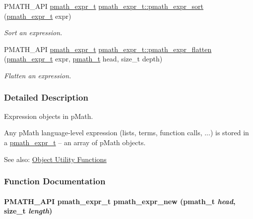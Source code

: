 \begin{CompactItemize}
PMATH\_\-API \hyperlink{classpmath__expr__t}{pmath\_\-expr\_\-t} \hyperlink{group__expressions_gb3708a99c95943b062a91797d340dd7b}{pmath\_\-expr\_\-t::pmath\_\-expr\_\-sort} (\hyperlink{classpmath__expr__t}{pmath\_\-expr\_\-t} expr)
\begin{CompactList}\small\item\em Sort an expression. \item\end{CompactList}\item 
PMATH\_\-API \hyperlink{classpmath__expr__t}{pmath\_\-expr\_\-t} \hyperlink{group__expressions_g9162f7fe8a42627c5adf6185dba9e67d}{pmath\_\-expr\_\-t::pmath\_\-expr\_\-flatten} (\hyperlink{classpmath__expr__t}{pmath\_\-expr\_\-t} expr, \hyperlink{classpmath__t}{pmath\_\-t} head, size\_\-t depth)
\begin{CompactList}\small\item\em Flatten an expression. \item\end{CompactList}\end{CompactItemize}


\subsubsection{Detailed Description}
Expression objects in pMath. 

Any pMath language-level expression (lists, terms, function calls, ...) is stored in a \hyperlink{classpmath__expr__t}{pmath\_\-expr\_\-t} -- an array of pMath objects.

\begin{Desc}
\item[See also:]\hyperlink{group__helpers}{Object Utility Functions} \end{Desc}


\subsubsection{Function Documentation}
\hypertarget{group__expressions_ga830588c2d0d6e28e78dfe6838f9935f}{
\paragraph[{pmath\_\-expr\_\-new}]{\setlength{\rightskip}{0pt plus 5cm}PMATH\_\-API {\bf pmath\_\-expr\_\-t} pmath\_\-expr\_\-new ({\bf pmath\_\-t} {\em head}, \/  size\_\-t {\em length})}\hfill}
\label{group__expressions_ga830588c2d0d6e28e78dfe6838f9935f}


